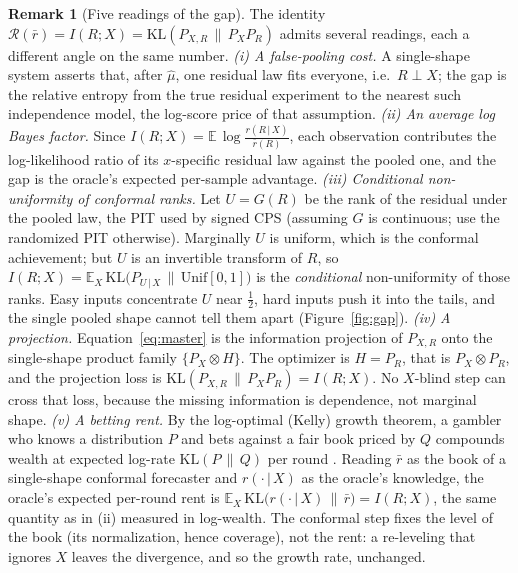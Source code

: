 \documentclass[11pt]{article}
\theoremstyle{definition}
\newtheorem{remark}{Remark}
\newcommand{\E}{\mathbb{E}}
\newcommand{\KL}{\mathrm{KL}}
\newcommand{\given}{\,\vert\,}
\begin{document}
\begin{remark}[Five readings of the gap]\label{rem:readings}
The identity $\mathcal{R}(\bar r)=I(R;X)=\KL(P_{X,R}\,\|\,P_X P_R)$ admits several readings, each a
different angle on the same number.
\emph{(i) A false-pooling cost.} A single-shape system asserts that, after $\hat\mu$, one
residual law fits everyone, i.e.\ $R\perp X$; the gap is the relative entropy from the true
residual experiment to the nearest such independence model, the log-score price of that
assumption.
\emph{(ii) An average log Bayes factor.} Since
$I(R;X)=\E\,\log\frac{r(R\given X)}{\bar r(R)}$, each observation contributes the
log-likelihood ratio of its $x$-specific residual law against the pooled one, and the gap is
the oracle's expected per-sample advantage.
\emph{(iii) Conditional non-uniformity of conformal ranks.} Let $U=G(R)$ be the rank of the
residual under the pooled law, the PIT used by signed CPS (assuming $G$ is continuous; use the
randomized PIT otherwise). Marginally $U$ is uniform, which
is the conformal achievement; but $U$ is an invertible transform of $R$, so
$I(R;X)=\E_X\,\KL\!\big(P_{U\given X}\,\|\,\mathrm{Unif}[0,1]\big)$ is the \emph{conditional}
non-uniformity of those ranks. Easy inputs concentrate $U$ near $\tfrac12$, hard inputs push
it into the tails, and the single pooled shape cannot tell them apart (Figure~\ref{fig:gap}).
\emph{(iv) A projection.} Equation~\eqref{eq:master} is the information projection of
$P_{X,R}$ onto the single-shape product family $\{P_X\otimes H\}$. The optimizer is $H=P_R$,
that is $P_X\otimes P_R$, and the projection loss is $\KL(P_{X,R}\,\|\,P_X P_R)=I(R;X)$. No
$X$-blind step can cross that loss, because the missing information is dependence, not
marginal shape.
\emph{(v) A betting rent.} By the log-optimal (Kelly) growth theorem, a gambler who knows a
distribution $P$ and bets against a fair book priced by $Q$ compounds wealth at expected
log-rate $\KL(P\,\|\,Q)$ per round \citep{kelly1956new,cover2006elements}. Reading $\bar r$ as
the book of a single-shape conformal forecaster and $r(\cdot\given X)$ as the oracle's
knowledge, the oracle's expected per-round rent is $\E_X\,\KL\big(r(\cdot\given X)\,\|\,\bar
r\big)=I(R;X)$, the same quantity as in (ii) measured in log-wealth. The conformal step fixes
the level of the book (its normalization, hence coverage), not the rent: a re-leveling that
ignores $X$ leaves the divergence, and so the growth rate, unchanged.
\end{remark}
\end{document}

